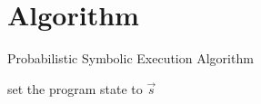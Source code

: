 \section{Algorithm}
\label{sec:algorithm}


\begin{algorithm}
	\caption{Probabilistic Symbolic Execution Algorithm}
	\label{alg:symb_ex}
	\SetAlgoLined
	\small
	set the program state to $\vec{s}$\;
\end{algorithm}